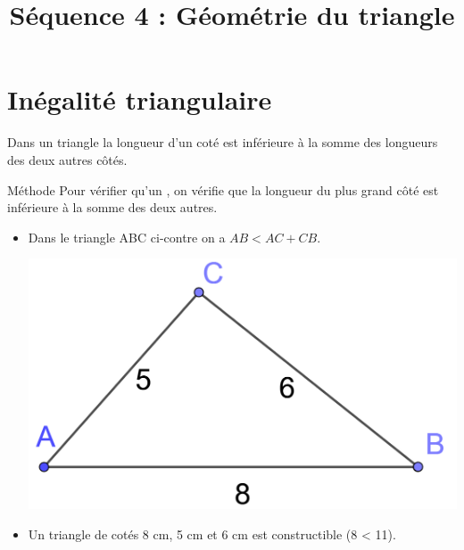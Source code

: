 \documentclass[xcolor={dvipsnames}]{beamer}
\title{Séquence 4 : Géométrie du triangle}
\begin{document}
\begin{frame}
  \titlepage 
\end{frame}


	
\begin{frame}
	
\end{frame}

\section{Inégalité triangulaire}


\begin{frame}
	\begin{myprop}
		
			Dans un triangle la longueur d'un coté est inférieure à la somme des longueurs des deux autres côtés.\pause
			

		
	\end{myprop}
	
	\begin{block}{Méthode}
		Pour vérifier qu'un , \pause on vérifie que la longueur du plus grand côté  est inférieure à la somme des deux autres.
	\end{block}
\end{frame}


\begin{frame}
	\begin{myexs}
		
		\begin{itemize}
			\item Dans le triangle ABC ci-contre on a $AB < AC + CB.$
				\begin{center}
					\includegraphics[scale=0.25]{triangle1}\pause
					
				\end{center}
			
			\item 	Un triangle de cotés 8 cm, 5 cm et 6 cm est constructible (8 < 11).
		\end{itemize}
		
		
		
	\end{myexs}
\end{frame}
\end{document}
